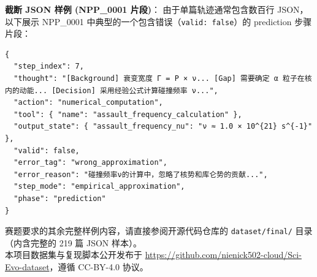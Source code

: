 \documentclass[12pt,a4paper]{article}
\begin{document}
\noindent
\textbf{截断 JSON 样例 (NPP\_0001 片段)}：
由于单篇轨迹通常包含数百行 JSON，以下展示 NPP\_0001 中典型的一个包含错误（\texttt{valid: false}）的 prediction 步骤片段：

\begin{verbatim}
{
  "step_index": 7,
  "thought": "[Background] 衰变宽度 Γ = P × ν... [Gap] 需要确定 α 粒子在核内的动能... [Decision] 采用经验公式计算碰撞频率 ν...",
  "action": "numerical_computation",
  "tool": { "name": "assault_frequency_calculation" },
  "output_state": { "assault_frequency_nu": "ν ≈ 1.0 × 10^{21} s^{-1}" },
  "valid": false,
  "error_tag": "wrong_approximation",
  "error_reason": "碰撞频率ν的计算中，忽略了核势和库仑势的贡献...",
  "step_mode": "empirical_approximation",
  "phase": "prediction"
}
\end{verbatim}
赛题要求的其余完整样例内容，请直接参阅开源代码仓库的 \texttt{dataset/final/} 目录（内含完整的 219 篇 JSON 样本）。\\

本项目数据集与复现脚本公开发布于 \url{https://github.com/nienick502-cloud/Sci-Evo-dataset}，遵循 CC-BY-4.0 协议。

  
\end{document}
